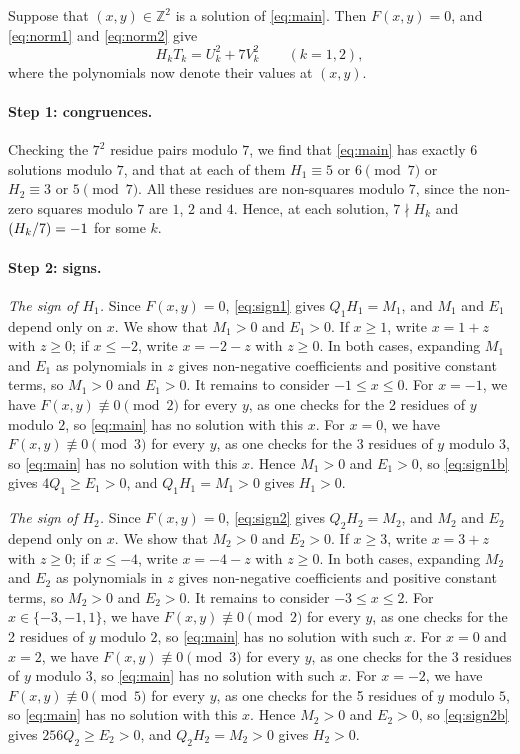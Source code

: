\documentclass[11pt]{article}
\newcommand{\Z}{\mathbb{Z}}
\newcommand{\leg}[2]{\mathchoice{\biggl(\dfrac{#1}{#2}\biggr)}{(#1/#2)}{(#1/#2)}{(#1/#2)}}
\begin{document}
Suppose that $(x,y)\in\Z^2$ is a solution of \eqref{eq:main}. Then $F(x,y)=0$, and \eqref{eq:norm1} and \eqref{eq:norm2} give
\begin{equation}\label{eq:HT}
H_kT_k=U_k^2+7V_k^2\qquad(k=1,2),
\end{equation}
where the polynomials now denote their values at $(x,y)$.

\paragraph{Step 1: congruences.} Checking the $7^2$ residue pairs modulo $7$, we find that \eqref{eq:main} has exactly 6 solutions modulo $7$, and that at each of them $H_{1}\equiv5\text{ or }6\pmod{7}$ or $H_{2}\equiv3\text{ or }5\pmod{7}$. All these residues are non-squares modulo $7$, since the non-zero squares modulo $7$ are $1$, $2$ and $4$. Hence, at each solution, $7\nmid H_k$ and $\leg{H_k}{7}=-1$ for some $k$.

\paragraph{Step 2: signs.} \emph{The sign of $H_{1}$.} Since $F(x,y)=0$, \eqref{eq:sign1} gives $Q_{1}H_{1}=M_{1}$, and $M_{1}$ and $E_{1}$ depend only on $x$. We show that $M_{1}>0$ and $E_{1}>0$. If $x\geq1$, write $x=1+z$ with $z\geq0$; if $x\leq-2$, write $x=-2-z$ with $z\geq0$. In both cases, expanding $M_{1}$ and $E_{1}$ as polynomials in $z$ gives non-negative coefficients and positive constant terms, so $M_{1}>0$ and $E_{1}>0$. It remains to consider $-1\leq x\leq0$. For $x=-1$, we have $F(x,y)\not\equiv0\pmod{2}$ for every $y$, as one checks for the 2 residues of $y$ modulo $2$, so \eqref{eq:main} has no solution with this $x$. For $x=0$, we have $F(x,y)\not\equiv0\pmod{3}$ for every $y$, as one checks for the 3 residues of $y$ modulo $3$, so \eqref{eq:main} has no solution with this $x$. Hence $M_{1}>0$ and $E_{1}>0$, so \eqref{eq:sign1b} gives $4Q_{1}\geq E_{1}>0$, and $Q_{1}H_{1}=M_{1}>0$ gives $H_{1}>0$.

\emph{The sign of $H_{2}$.} Since $F(x,y)=0$, \eqref{eq:sign2} gives $Q_{2}H_{2}=M_{2}$, and $M_{2}$ and $E_{2}$ depend only on $x$. We show that $M_{2}>0$ and $E_{2}>0$. If $x\geq3$, write $x=3+z$ with $z\geq0$; if $x\leq-4$, write $x=-4-z$ with $z\geq0$. In both cases, expanding $M_{2}$ and $E_{2}$ as polynomials in $z$ gives non-negative coefficients and positive constant terms, so $M_{2}>0$ and $E_{2}>0$. It remains to consider $-3\leq x\leq2$. For $x\in\{-3,-1,1\}$, we have $F(x,y)\not\equiv0\pmod{2}$ for every $y$, as one checks for the 2 residues of $y$ modulo $2$, so \eqref{eq:main} has no solution with such $x$. For $x=0$ and $x=2$, we have $F(x,y)\not\equiv0\pmod{3}$ for every $y$, as one checks for the 3 residues of $y$ modulo $3$, so \eqref{eq:main} has no solution with such $x$. For $x=-2$, we have $F(x,y)\not\equiv0\pmod{5}$ for every $y$, as one checks for the 5 residues of $y$ modulo $5$, so \eqref{eq:main} has no solution with this $x$. Hence $M_{2}>0$ and $E_{2}>0$, so \eqref{eq:sign2b} gives $256Q_{2}\geq E_{2}>0$, and $Q_{2}H_{2}=M_{2}>0$ gives $H_{2}>0$.
\end{document}
